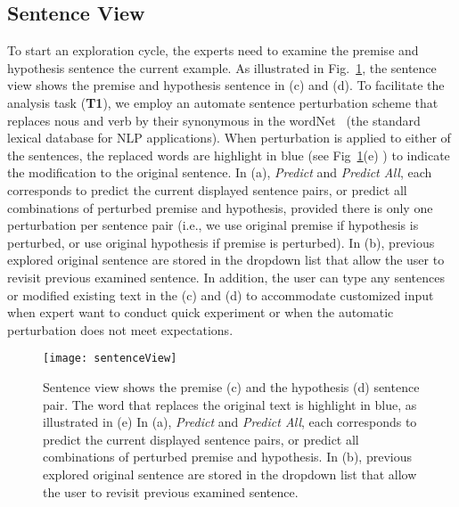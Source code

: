 \subsection{Sentence View}
To start an exploration cycle, the experts need to examine the premise and hypothesis sentence the current example. 
As illustrated in Fig.~\ref{fig:modelPipeline}, the sentence view shows the premise and hypothesis sentence in (c) and (d).
%
To facilitate the analysis task (\textbf{T1}), we employ an automate sentence perturbation scheme that replaces nous and verb by their synonymous in the wordNet~\cite{Miller1995} (the standard lexical database for NLP applications).
%
When perturbation is applied to either of the sentences, the replaced words are highlight in blue (see Fig~\ref{fig:modelPipeline}(e) ) to indicate the modification to the original sentence.
%
In (a), \emph{Predict} and \emph{Predict All}, each corresponds to predict the current displayed sentence pairs, or predict all combinations of perturbed premise and hypothesis, provided there is only one perturbation per sentence pair (i.e., we use original premise if hypothesis is perturbed, or use original hypothesis if premise is perturbed). 
In (b), previous explored original sentence are stored in the dropdown list that allow the user to revisit previous examined sentence.
In addition, the user can type any sentences or modified existing text in the (c) and (d) to accommodate customized input when expert want to conduct quick experiment or when the automatic perturbation does not meet expectations.

\begin{figure}[htbp]
\centering
\vspace{-2mm}
 \texttt{[image: sentenceView]}
 \caption{
Sentence view shows the premise (c) and the hypothesis (d) sentence pair. The word that replaces the original text is highlight in blue, as illustrated in (e)
In (a), \emph{Predict} and \emph{Predict All}, each corresponds to predict the current displayed sentence pairs, or predict all combinations of perturbed premise and hypothesis.
In (b), previous explored original sentence are stored in the dropdown list that allow the user to revisit previous examined sentence.
 }
\label{fig:modelPipeline}
\end{figure}

